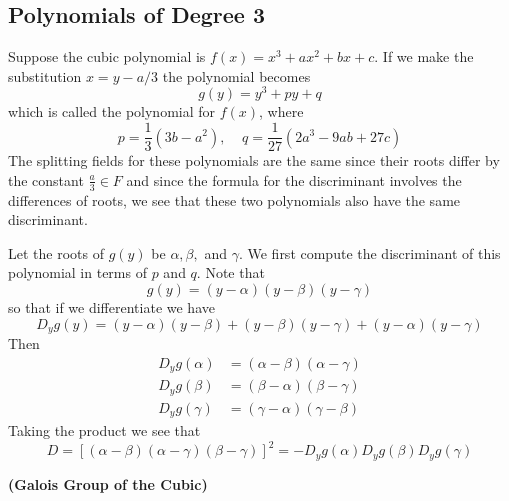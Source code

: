 \subsection{Polynomials of Degree 3}

Suppose the cubic polynomial is $f(x) = x^3+ax^2+bx+c$. If we make the substitution $x = y-a/3$ the polynomial becomes \begin{equation*}
    g(y) = y^3+py+q
\end{equation*}
which is called the  polynomial for $f(x)$, where \begin{equation*}
    p = \frac{1}{3}(3b-a^2),\;\;\;\;q = \frac{1}{27}(2a^3-9ab+27c)
\end{equation*}
The splitting fields for these polynomials are the same since their roots differ by the constant $\frac{a}{3} \in F$ and since the formula for the discriminant involves the differences of roots, we see that these two polynomials also have the same discriminant.

Let the roots of $g(y)$ be $\alpha, \beta,$ and $\gamma$. We first compute the discriminant of this polynomial in terms of $p$ and $q$. Note that \begin{equation*}
    g(y) = (y-\alpha)(y-\beta)(y-\gamma)
\end{equation*}
so that if we differentiate we have \begin{equation*}
    D_yg(y) = (y-\alpha)(y-\beta) + (y-\beta)(y-\gamma) + (y-\alpha)(y-\gamma)
\end{equation*}
Then \begin{align*}
    D_yg(\alpha) &= (\alpha-\beta)(\alpha-\gamma) \\
    D_yg(\beta) &= (\beta-\alpha)(\beta -\gamma) \\
    D_yg(\gamma) &= (\gamma - \alpha)(\gamma - \beta)
\end{align*}
Taking the product we see that \begin{equation*}
    D = [(\alpha-\beta)(\alpha-\gamma)(\beta-\gamma)]^2 = -D_yg(\alpha)D_yg(\beta)D_yg(\gamma)
\end{equation*}


\textbf{(Galois Group of the Cubic)}

